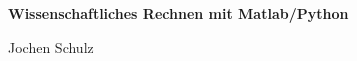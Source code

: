 \usepackage[psamsfonts]{amssymb}
\usepackage{amsmath}
\usepackage[svgnames]{xcolor} %







\begin{center}
\textbf{\LARGE Wissenschaftliches Rechnen mit Matlab/Python}\\
\end{center}
\begin{minipage}{6cm}
Jochen Schulz
\end{minipage}\hfill
